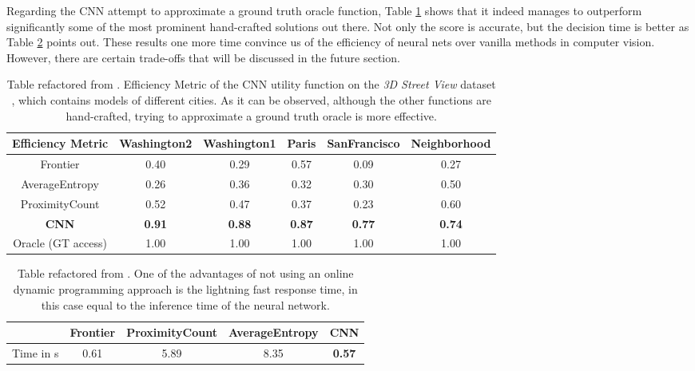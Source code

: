\documentclass[a4paper,11pt,english]{article}
\begin{document}
Regarding the CNN attempt to approximate a ground truth oracle function, Table \ref{tab:hepptable1} shows that it indeed manages to outperform significantly some of the most prominent hand-crafted solutions out there. Not only the score is accurate, but the decision time is better as Table \ref{tab:hepptable2} points out. These results one more time convince us of the efficiency of neural nets over vanilla methods in computer vision. However, there are certain trade-offs that will be discussed in the future section.
\begin{table}[t!]
\caption{\label{tab:hepptable1} Table refactored from \cite{hepp2018learn}. Efficiency Metric of the CNN utility function on the \textit{3D Street View} dataset \cite{zamir2016generic}, which contains models of different cities. As it can be observed, although the other functions are hand-crafted, trying to approximate a ground truth oracle is more effective.}
\begin{adjustbox}{width=\columnwidth,center}
\begin{tabular}{ |c|c|c|c|c|c| } 
\hline 
 Efficiency Metric & Washington2 & Washington1 & Paris & SanFrancisco & Neighborhood\\
 \hline
 Frontier & 0.40 & 0.29 & 0.57 & 0.09 & 0.27 \\ 
 AverageEntropy \cite{isler2016information}& 0.26 & 0.36 & 0.32 & 0.30 & 0.50 \\ 
 ProximityCount \cite{isler2016information}& 0.52 & 0.47 & 0.37 & 0.23 & 0.60 \\ 
 \textbf{CNN \cite{hepp2018learn}} & \textbf{0.91} & \textbf{0.88} & \textbf{0.87} & \textbf{0.77} & \textbf{0.74} \\
 Oracle (GT access) & 1.00 & 1.00 & 1.00 & 1.00 & 1.00 \\
 \hline
\end{tabular}
\end{adjustbox}

\end{table}

\begin{table}[t!]
\caption{\label{tab:hepptable2} Table refactored from \cite{hepp2018learn}. One of the advantages of not using an online dynamic programming approach is the lightning fast response time, in this case equal to the inference time of the neural network.}
\begin{adjustbox}{width=\columnwidth,center}
\begin{tabular}{ |c|c|c|c|c| } 
\hline
& Frontier & ProximityCount & AverageEntropy & CNN \cite{hepp2018learn}\\
\hline
Time in s & 0.61 & 5.89 & 8.35 & \textbf{0.57}\\
\hline
\end{tabular}
\end{adjustbox}

\end{table}
\end{document}
